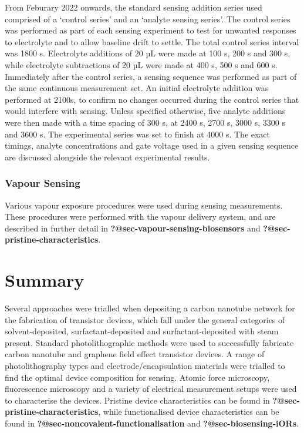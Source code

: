 \documentclass[
  a4paper,
]{scrbook}
\begin{document}
From Feburary 2022 onwards, the standard sensing addition series used
comprised of a `control series' and an `analyte sensing series'. The
control series was performed as part of each sensing experiment to test
for unwanted responses to electrolyte and to allow baseline drift to
settle. The total control series interval was 1800 s. Electrolyte
additions of 20 µL were made at 100 s, 200 s and 300 s, while
electrolyte subtractions of 20 µL were made at 400 s, 500 s and 600 s.
Immediately after the control series, a sensing sequence was performed
as part of the same continuous measurement set. An initial electrolyte
addition was performed at 2100s, to confirm no changes occurred during
the control series that would interfere with sensing. Unless specified
otherwise, five analyte additions were then made with a time spacing of
300 s, at 2400 s, 2700 s, 3000 s, 3300 s and 3600 s. The experimental
series was set to finish at 4000 s. The exact timings, analyte
concentrations and gate voltage used in a given sensing sequence are
discussed alongside the relevant experimental results.

\hypertarget{vapour-sensing}{%
\subsubsection*{Vapour Sensing}\label{vapour-sensing}}

Various vapour exposure procedures were used during sensing
measurements. These procedures were performed with the vapour delivery
system, and are described in further detail in
\textbf{?@sec-vapour-sensing-biosensors} and
\textbf{?@sec-pristine-characteristics}.

\hypertarget{summary}{%
\section{Summary}\label{summary}}

Several approaches were trialled when depositing a carbon nanotube
network for the fabrication of transistor devices, which fall under the
general categories of solvent-deposited, surfactant-deposited and
surfactant-deposited with steam present. Standard photolithographic
methods were used to successfully fabricate carbon nanotube and graphene
field effect transistor devices. A range of photolithography types and
electrode/encapsulation materials were trialled to find the optimal
device composition for sensing. Atomic force microscopy, fluorescence
microscopy and a variety of electrical measurement setups were used to
characterise the devices. Pristine device characteristics can be found
in \textbf{?@sec-pristine-characteristics}, while functionalised device
characteristics can be found in
\textbf{?@sec-noncovalent-functionalisation} and
\textbf{?@sec-biosensing-iORs}.
\end{document}
